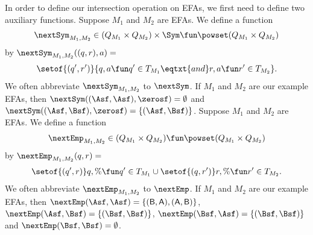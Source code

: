 In order to define our intersection operation on EFAs, we first need
to define two auxiliary functions.  Suppose $M_1$ and $M_2$ are EFAs.
We define a function
\begin{gather*}
\nextSym_{M_1,M_2}\in
(Q_{M_1}\times Q_{M_2})\times\Sym \fun
\powset(Q_{M_1}\times Q_{M_2})
\end{gather*}
by $\nextSym_{M_1,M_2}((q,r),a)={}$
\begin{gather*}
\setof{(q',r')}{q,a\fun q'\in T_{M_1}\eqtxt{and}
r,a\fun r'\in T_{M_2}} .
\end{gather*}
We often abbreviate $\nextSym_{M_1,M_2}$ to $\nextSym$.
If $M_1$ and $M_2$ are our example EFAs, then
$\nextSym((\Asf,\Asf),\zerosf) = \emptyset$ and
$\nextSym((\Asf,\Bsf),\zerosf) = \{(\Asf,\Bsf)\}$.
Suppose $M_1$ and $M_2$ are EFAs.  We define a function
\begin{gather*}
\nextEmp_{M_1,M_2}\in
(Q_{M_1}\times Q_{M_2})\fun\powset(Q_{M_1}\times Q_{M_2})
\end{gather*}
by $\nextEmp_{M_1,M_2}(q,r)={}$
\begin{gather*}
\setof{(q',r)}{q,\%\fun q'\in T_{M_1}} \cup
\setof{(q,r')}{r,\%\fun r'\in T_{M_2}} .
\end{gather*}
We often abbreviate $\nextEmp_{M_1,M_2}$ to $\nextEmp$.  If $M_1$ and
$M_2$ are our example EFAs, then $\nextEmp(\Asf,\Asf) =
\{\mathsf{(B,A),(A,B)}\}$, $\nextEmp(\Asf,\Bsf) = \{(\Bsf,\Bsf)\}$,
$\nextEmp(\Bsf,\Asf) = \{(\Bsf,\Bsf)\}$ and $\nextEmp(\Bsf,\Bsf) =
\emptyset$.

